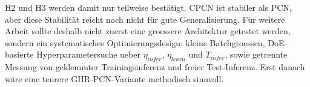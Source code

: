 H2 und H3 werden damit nur teilweise bestätigt. CPCN ist stabiler als PCN, aber diese Stabilität reicht noch nicht für gute Generalisierung. Für weitere Arbeit sollte deshalb nicht zuerst eine groessere Architektur getestet werden, sondern ein systematisches Optimierungsdesign: kleine Batchgroessen, DoE-basierte Hyperparametersuche ueber $\eta_{infer}$, $\eta_{learn}$ und $T_{infer}$, sowie getrennte Messung von geklemmter Trainingsinferenz und freier Test-Inferenz. Erst danach wäre eine teurere GHR-PCN-Variante methodisch sinnvoll.
